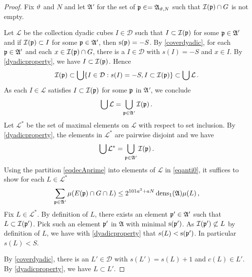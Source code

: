 \begin{proof}
    Fix $\vartheta$ and $N$ and let
$\mathfrak{A}'$ for the set of $\mathfrak p\in=\mathfrak{A}_{\vartheta,N}$ such that $\mathcal{I}(\mathfrak p)\cap G$ is not empty.



    Let $\mathcal{L}$ be the collection dyadic cubes $I\in\mathcal{D}$ such that $I\subset \mathcal{I}(\mathfrak p)$ for some $\mathfrak p\in\mathfrak{A}'$ and if $\mathcal{I}(\mathfrak p)\subset I$ for some $\mathfrak p\in\mathfrak{A}'$, then $\mathrm{s}(\mathfrak p)=-S$. By \eqref{coverdyadic}, for each $\mathfrak p \in \mathfrak{A}'$
    and each $x\in \mathcal{I}(\mathfrak p)\cap G$, there is a $I\in \mathcal{D}$ with $s(I)=-S$ and $x\in I$. By \eqref{dyadicproperty},
    we have $I\subset \mathcal{I}(\mathfrak p)$. Hence
    \begin{equation}
        \mathcal{I}(\mathfrak p)\subset \bigcup\{I\in \mathcal{D}: s(I)=-S, I\subset \mathcal{I}(\mathfrak p)\}\subset \bigcup \mathcal{L}\, .
    \end{equation}
As each $I\in \mathcal{L}$ satisfies $I\subset \mathcal{I}(\mathfrak p)$ for some $\mathfrak p$ in $\mathfrak{A'}$, we conclude
        \begin{equation}
\bigcup\mathcal{L}=\bigcup_{\mathfrak p \in \mathfrak{A}'}\mathcal{I}(\mathfrak p)\, .
    \end{equation}
Let $\mathcal{L}^*$ be the set of maximal elements on $\mathcal{L}$ with respect to set inclusion.
By \eqref{dyadicproperty}, the elements in $\mathcal{L}^*$ are pairwise disjoint and we have
    \begin{equation}\label{eqdecAprime}
\bigcup\mathcal{L}^*=\bigcup_{\mathfrak p \in \mathfrak{A}'}\mathcal{I}(\mathfrak p)\, .
    \end{equation}
Using the partition \eqref{eqdecAprime} into elements of $\mathcal{L}$ in \eqref{eqanti0}, it suffices to show for each $L\in \mathcal{L}^*$
\begin{equation}\label{eqanti0}
    \sum_{\mathfrak p\in\mathfrak{A}'}\mu(E(\mathfrak p)\cap G \cap L)
    \le
2^{101a^3+aN}
\operatorname{\operatorname{dens}}_1(\mathfrak{A})\mu(L)\, ,
\end{equation}
Fix $L\in \mathcal{L}^*$.
By definition of $L$, there exists an element $\mathfrak p'\in \mathfrak{A}'$ such that $L\subset \mathcal{I}(\mathfrak p')$. Pick such an element $\mathfrak p
'$
in $\mathfrak{A}$ with minimal $\mathrm{s}(\mathfrak p')$. As $\mathcal{I}(\mathfrak p')\not \subset L$ by definition of $L$, we have
with \eqref{dyadicproperty} that $s(L)< \mathrm{s}(\mathfrak p')$. In particular $s(L)<S$.

By \eqref{coverdyadic}, there is an
$L'\in \mathcal{D}$ with $s(L')=s(L)+1$ and $c(L)\in L'$. By \eqref{dyadicproperty}, we have
$L\subset L'$.


\end{proof}
